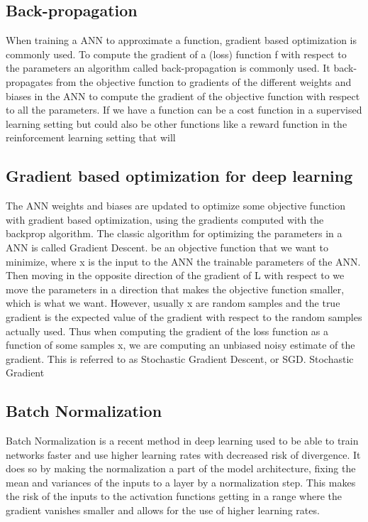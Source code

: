 \subsection{Back-propagation}
When training a ANN to approximate a function, gradient based optimization
is commonly used. To compute the gradient of a (loss) function f with
respect to the parameters  an algorithm called back-propagation is commonly
used. It back-propagates from the objective function to gradients of the different
weights and biases in the ANN to compute the gradient of the objective function with respect to all the parameters. If we have a function 
can be a cost function in a supervised learning setting but could also be other
functions like a reward function in the reinforcement learning setting that will

\subsection{Gradient based optimization for deep learning}

The ANN weights and biases are updated to optimize some objective function
with gradient based optimization, using the gradients computed with the backprop algorithm.
The classic algorithm for optimizing the parameters in a ANN is called Gradient
Descent. be an objective function that we want to minimize, where
x is the input to the ANN the trainable parameters of the ANN. Then
moving in the opposite direction of the gradient of L with respect to  we move
the parameters in a direction that makes the objective function smaller, which is
what we want. However, usually x are random samples and the true gradient is
the expected value of the gradient with respect to the random samples actually
used. Thus when computing the gradient of the loss function as a function of
some samples x, we are computing an unbiased noisy estimate of the gradient.
This is referred to as Stochastic Gradient Descent, or SGD. Stochastic Gradient

\subsection{Batch Normalization}
Batch Normalization is a recent method in deep learning used to be able to train
networks faster and use higher learning rates with decreased risk of divergence.
It does so by making the normalization a part of the model architecture, fixing
the mean and variances of the inputs to a layer by a normalization step. This
makes the risk of the inputs to the activation functions getting in a range where
the gradient vanishes smaller and allows for the use of higher learning rates. 

